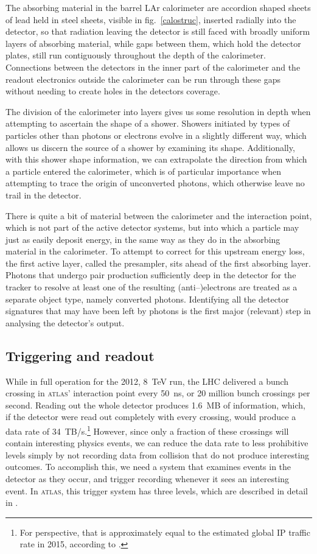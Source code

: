 The absorbing material in the barrel LAr calorimeter are accordion shaped sheets of lead held in steel sheets, visible in fig.~\ref{calostruc}, inserted radially into the detector, so that radiation leaving the detector is still faced with broadly uniform layers of absorbing material, while gaps between them, which hold the detector plates, still run contiguously throughout the depth of the calorimeter. Connections between the detectors in the inner part of the calorimeter and the readout electronics outside the calorimeter can be run through these gaps without needing to create holes in the detectors coverage.

The division of the calorimeter into layers gives us some resolution in depth when attempting to ascertain the shape of a shower. Showers initiated by types of particles other than photons or electrons evolve in a slightly different way, which allows us discern the source of a shower by examining its shape. Additionally, with this shower shape information, we can extrapolate the direction from which a particle entered the calorimeter, which is of particular importance when attempting to trace the origin of unconverted photons, which otherwise leave no trail in the detector.

There is quite a bit of material between the calorimeter and the interaction point, which is not part of the active detector systems, but into which a particle may just as easily deposit energy, in the same way as they do in the absorbing material in the calorimeter. To attempt to correct for this upstream energy loss, the first active layer, called the presampler, sits ahead of the first absorbing layer. Photons that undergo pair production sufficiently deep in the detector for the tracker to resolve at least one of the resulting (anti--)electrons are treated as a separate object type, namely converted photons. Identifying all the detector signatures that may have been left by photons is the first major (relevant) step in analysing the detector's output.

\subsection{Triggering and readout}
While in full operation for the 2012, 8~TeV run, the LHC delivered a bunch crossing in \textsc{atlas}' interaction point every 50~ns, or 20 million bunch crossings per second. Reading out the whole detector produces 1.6~MB of information, which, if the detector were read out completely with every crossing, would produce a data rate of 34~TB/s.\footnote{For perspective, that is approximately equal to the estimated global IP traffic rate in 2015, according to \cite{wolframip}.} However, since only a fraction of these crossings will contain interesting physics events, we can reduce the data rate to less prohibitive levels simply by not recording data from collision that do not produce interesting outcomes. To accomplish this, we need a system that examines events in the detector as they occur, and trigger recording whenever it sees an interesting event. In \textsc{atlas}, this trigger system has three levels, which are described in detail in \cite{detectorpaper}. 

